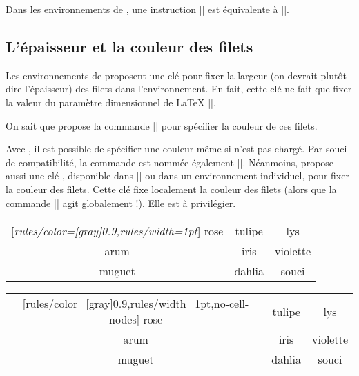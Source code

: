 \documentclass[dvipsnames]{article}%
\begin{document}
\medskip
Dans les environnements de , une instruction
|| est équivalente à
||.

\subsection{L'épaisseur et la couleur des filets}


Les environnements de  proposent une clé
 pour fixer la largeur (on devrait plutôt dire
l'épaisseur) des filets dans l'environnement. En fait, cette clé ne fait que
fixer la valeur du paramètre dimensionnel de LaTeX |\arrayrulewidth|.

\smallskip
On sait que  propose la commande |\arrayrulecolor| pour spécifier
la couleur de ces filets.

\smallskip
{} 
Avec , il est possible de spécifier une couleur même si
 n'est pas chargé. Par souci de compatibilité, la commande est
nommée également |\arrayrulecolor|. Néanmoins,  propose aussi
une clé , disponible dans |\NiceMatrixOptions| ou dans un
environnement individuel, pour fixer la couleur des filets. Cette clé fixe
localement la couleur des filets (alors que la commande |\arrayrulecolor| agit
globalement !). Elle est à privilégier.

\medskip
\begin{Code}[width=15cm]
\begin{NiceTabular}{|ccc|}[\emph{rules/color=[gray]{0.9},rules/width=1pt}]
\hline
rose & tulipe & lys \\
arum & iris & violette \\
muguet & dahlia & souci \\
\hline
\end{NiceTabular}
\end{Code}
\hspace{-5cm}
\begin{NiceTabular}{|ccc|}[rules/color=[gray]{0.9},rules/width=1pt,no-cell-nodes]
\hline
rose & tulipe & lys \\
arum & iris & violette \\
muguet & dahlia & souci \\
\hline
\end{NiceTabular}
\end{document}
